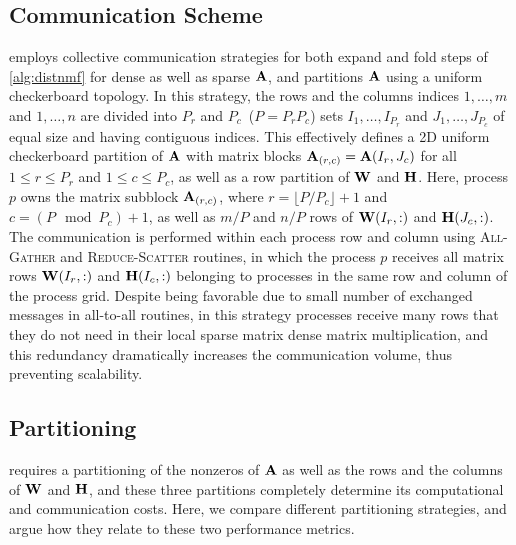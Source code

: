 \subsection{Communication Scheme}
\mpifaun employs collective communication strategies for both expand and fold steps of \cref{alg:distnmf} for dense as well as sparse $\mathbf{A}$, and partitions $\mathbf{A}$ using a uniform checkerboard topology.
In this strategy, the rows and the columns indices $1, \dots, m$ and $1, \dots, n$ are divided into $P_r$ and $P_c$~($P = P_r P_c$) sets $I_1, \dots, I_{P_r}$ and $J_1, \dots, J_{P_c}$ of equal size and having contiguous indices.
This effectively defines a 2D uniform checkerboard partition of $\mathbf{A}$ with matrix blocks $\mathbf{A}_{(r,c)} = \mathbf{A}(I_r, J_c)$ for all $1 \le r \le P_r$ and $1 \le c \le P_c$, as well as a row partition of $\mathbf{W}$ and $\mathbf{H}$.
Here, process $p$ owns the matrix subblock $\mathbf{A}_{(r, c)}$, where $r = \lfloor P/P_c \rfloor + 1$ and $c = (P \mod P_c) + 1$, as well as $m / P$ and $n / P$ rows of $\mathbf{W}(I_r, :)$ and $\mathbf{H}(J_c, :)$.
The communication is performed within each process row and column using \textsc{All-Gather} and \textsc{Reduce-Scatter} routines, in which the process $p$ receives all matrix rows $\mathbf{W}(I_r, :)$ and $\mathbf{H}(I_c, :)$ belonging to processes in the same row and column of the process grid.
Despite being favorable due to small number of exchanged messages in all-to-all routines, in this strategy processes receive many rows that they do not need in their local sparse matrix dense matrix multiplication, and this redundancy dramatically increases the communication volume, thus preventing scalability. 


\subsection{Partitioning}
 requires a partitioning of the nonzeros of $\mathbf{A}$ as well as the rows and the columns of $\mathbf{W}$ and $\mathbf{H}$, and these three partitions completely determine its computational and communication costs.
Here, we compare different partitioning strategies, and argue how they relate to these two performance metrics.

